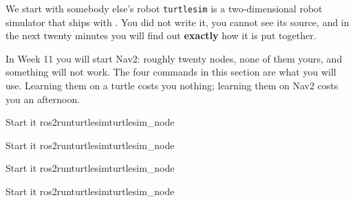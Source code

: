 \documentclass[aspectratio=169]{beamer}
\begin{document}
\begin{frame}{We start with somebody else's robot}
  \small
  \texttt{turtlesim} is a two-dimensional robot simulator that ships with \rosver. You did
  not write it, you cannot see its source, and in the next twenty minutes you will find out
  \textbf{exactly} how it is put together.

  \vspace{0.8em}

  \vspace{0.8em}
  \begin{inthefield}
    \footnotesize
    In Week 11 you will start Nav2: roughly twenty nodes, none of them yours, and something
    will not work. The four commands in this section are what you will use. Learning them on
    a turtle costs you nothing; learning them on Nav2 costs you an afternoon.
  \end{inthefield}
\end{frame}

\begin{frame}{Start it}
    {ros2}{run}{turtlesim}{turtlesim\_node}{}
\end{frame}

\begin{frame}{Start it}
    {ros2}{run}{turtlesim}{turtlesim\_node}{}
\end{frame}

\begin{frame}{Start it}
    {ros2}{run}{turtlesim}{turtlesim\_node}{}
\end{frame}

\begin{frame}{Start it}
    {ros2}{run}{turtlesim}{turtlesim\_node}{}
\end{frame}
\end{document}
